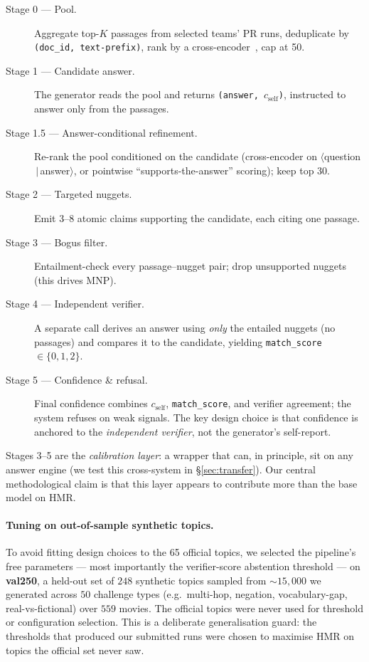 \documentclass[sigconf,nonacm]{acmart}
\newcommand{\HMR}{\textsc{HMR}}
\newcommand{\MNP}{\textsc{MNP}}
\begin{document}
\begin{description}
  \item[Stage 0 --- Pool.] Aggregate top-$K$ passages from selected teams' PR runs,
    deduplicate by \texttt{(doc\_id, text-prefix)}, rank by a cross-encoder~\cite{monobert},
    cap at 50.
  \item[Stage 1 --- Candidate answer.] The generator reads the pool and returns
    \texttt{(answer, $c_{\text{self}}$)}, instructed to answer only from the passages.
  \item[Stage 1.5 --- Answer-conditional refinement.] Re-rank the pool conditioned on the
    candidate (cross-encoder on $\langle$question$\,|\,$answer$\rangle$, or pointwise
    ``supports-the-answer'' scoring); keep top 30.
  \item[Stage 2 --- Targeted nuggets.] Emit 3--8 atomic claims supporting the candidate,
    each citing one passage.
  \item[Stage 3 --- Bogus filter.] Entailment-check every passage--nugget pair;
    drop unsupported nuggets (this drives \MNP).
  \item[Stage 4 --- Independent verifier.] A separate call derives an answer using
    \emph{only} the entailed nuggets (no passages) and compares it to the candidate,
    yielding \texttt{match\_score}$\in\{0,1,2\}$.
  \item[Stage 5 --- Confidence \& refusal.] Final confidence combines $c_{\text{self}}$,
    \texttt{match\_score}, and verifier agreement; the system refuses on weak signals. The
    key design choice is that confidence is anchored to the \emph{independent verifier},
    not the generator's self-report.
\end{description}

Stages 3--5 are the \emph{calibration layer}: a wrapper that can, in principle, sit on any
answer engine (we test this cross-system in \S\ref{sec:transfer}). Our central methodological claim is that this layer appears to contribute more than the
base model on \HMR.

\paragraph{Tuning on out-of-sample synthetic topics.} To avoid fitting design choices to
the 65 official topics, we selected the pipeline's free parameters --- most importantly the
verifier-score abstention threshold --- on \textbf{val250}, a held-out set of $248$
synthetic topics sampled from $\sim\!15{,}000$ we generated across $50$ challenge types
(e.g.\ multi-hop, negation, vocabulary-gap, real-vs-fictional) over $559$ movies. The
official topics were never used for threshold or configuration selection. This is a
deliberate generalisation guard: the thresholds that produced our submitted runs were
chosen to maximise \HMR{} on topics the official set never saw.
\end{document}
